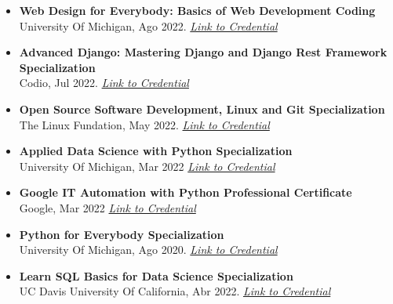 \documentclass[a4paper,10pt]{article}
\begin{document}
\begin{itemize}[left=0pt]
			\item \textbf{Web Design for Everybody: Basics of Web Development  Coding} \\
			University Of Michigan, Ago 2022.
			\textit{\href{https://portfolio-mparraf.herokuapp.com/static/shared/Web Design for Everybody Specialization.pdf}{Link to Credential}}
			
			\item \textbf{Advanced Django: Mastering Django and Django Rest Framework Specialization} \\
			Codio, Jul 2022.
			\textit{\href{https://portfolio-mparraf.herokuapp.com/static/shared/Advanced Django Mastering Specialization.pdf}{Link to Credential}}
			
			\item \textbf{Open Source Software Development, Linux and Git Specialization} \\
			The Linux Fundation, May 2022.
			\textit{\href{https://portfolio-mparraf.herokuapp.com/static/shared/Open Source Software Development, Linux and Git.pdf}{Link to Credential}}
			
			\item \textbf{Applied Data Science with Python Specialization} \\
			University Of Michigan, Mar 2022
			\textit{\href{https://portfolio-mparraf.herokuapp.com/static/shared/Applied Data Science with Python.pdf}{Link to Credential}}

			\item \textbf{Google IT Automation with Python Professional Certificate} \\
			Google, Mar 2022
			\textit{\href{https://portfolio-mparraf.herokuapp.com/static/shared/Google IT  Automation with Python.pdf}{Link to Credential}}
			
			\item \textbf{Python for Everybody Specialization} \\
			University Of Michigan, Ago 2020. \textit{\href{https://portfolio-mparraf.herokuapp.com/static/shared/PythonforEverybodySpecialization.pdf}{Link to Credential}}
			
			
			\item \textbf{Learn SQL Basics for Data Science Specialization} \\
			UC Davis University Of California, Abr 2022.
			\textit{\href{https://portfolio-mparraf.herokuapp.com/static/shared/Learn SQL Basics for Data Science Specialization.pdf}{Link to Credential}}
			
	
	\end{itemize}
	
\end{document}
